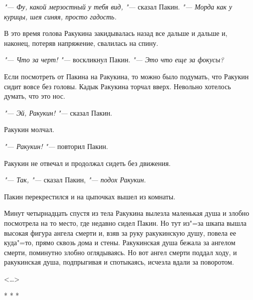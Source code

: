 \textit{"--- Фу, какой мерзостный у тебя вид, "---} сказал Пакин. \textit{"--- Морда как у курицы, шея синяя, просто гадость.}

В это время голова Ракукина закидывалась назад все дальше и дальше и, наконец, потеряв напряжение, свалилась на спину.

\textit{"--- Что за черт! "---} воскликнул Пакин. \textit{"--- Это что еще за фокусы?}

Если посмотреть от Пакина на Ракукина, то можно было подумать, что Ракукин сидит вовсе без головы. Кадык Ракукина торчал вверх. Невольно хотелось думать, что это нос.

\textit{"--- Эй, Ракукин! "---} сказал Пакин.

Ракукин молчал.

\textit{"--- Ракукин! "---} повторил Пакин.

Ракукин не отвечал и продолжал сидеть без движения.

\textit{"--- Так, "---} сказал Пакин, \textit{"--- подох Ракукин}.

Пакин перекрестился и на цыпочках вышел из комнаты.

Минут четырнадцать спустя из тела Ракукина вылезла маленькая душа и злобно посмотрела на то место, где недавно сидел Пакин. Но тут из"=за шкапа вышла высокая фигура ангела смерти и, взяв за руку ракукинскую душу, повела ее куда"=то, прямо сквозь дома и стены. Ракукинская душа бежала за ангелом смерти, поминутно злобно оглядываясь. Но вот ангел смерти поддал ходу, и ракукинская душа, подпрыгивая и спотыкаясь, исчезла вдали за поворотом.
\begin{flushright} <\dots> \end{flushright} 
\begin{center} * * * \end{center}